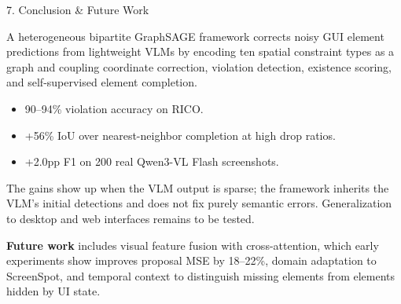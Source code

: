 \documentclass[final]{beamer}
\newlength{\colwidth}
\begin{document}
\begin{frame}[t]
\begin{columns}[t]
\begin{column}{\colwidth}
  \begin{block}{7. Conclusion \& Future Work}

    A heterogeneous bipartite GraphSAGE framework corrects noisy GUI element
    predictions from lightweight VLMs by encoding ten spatial constraint
    types as a graph and coupling coordinate correction, violation
    detection, existence scoring, and self-supervised element completion.

    \begin{itemize}
      \item 90--94\% violation accuracy on RICO.
      \item +56\% IoU over nearest-neighbor completion at high drop
        ratios.
      \item +2.0pp F1 on 200 real Qwen3-VL Flash screenshots.
    \end{itemize}

    \begin{center}
    \pgfmathsetlengthmacro{\cardwsum}{\dimexpr(0.8\colwidth - 1.2cm)/3\relax}
    \end{center}



    The gains show up when the VLM output is sparse; the framework inherits
    the VLM's initial detections and does not fix purely semantic errors.
    Generalization to desktop and web interfaces remains to be tested.

    \textbf{Future work} includes visual feature fusion with cross-attention,
    which early experiments show improves proposal MSE by 18--22\%, domain
    adaptation to ScreenSpot, and temporal context to distinguish missing
    elements from elements hidden by UI state.


\end{block}
\end{column}
\end{columns}
\end{frame}
\end{document}
